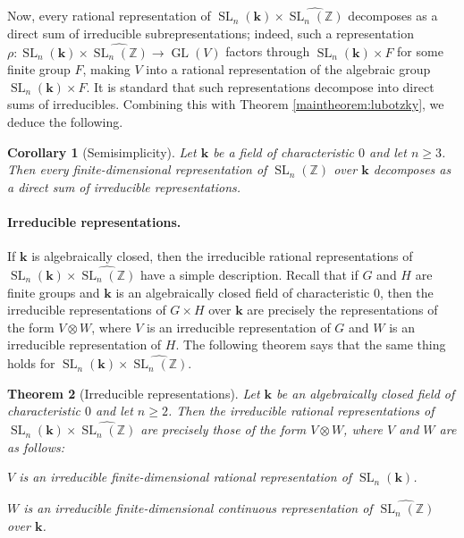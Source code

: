 \documentclass[11pt]{article}
\numberwithin{equation}{section}
\theoremstyle{plain}
\newtheorem{maintheorem}{Theorem}
\newtheorem{maincorollary}[maintheorem]{Corollary}
\theoremstyle{definition}
\theoremstyle{remark}
\DeclareMathOperator{\GL}{GL}
\DeclareMathOperator{\SL}{SL}
\newcommand\Z{\ensuremath{\mathbb{Z}}}
\newcommand\bk{\ensuremath{\mathbf{k}}}
\newcommand\tSLn{\ensuremath{\widehat{\SL_n(\Z)}}}
\begin{document}
Now, every rational representation of $\SL_n(\bk) \times \tSLn$ decomposes as a direct sum of irreducible
subrepresentations; indeed, such a representation $\rho\colon \SL_n(\bk) \times \tSLn \rightarrow \GL(V)$
factors through $\SL_n(\bk) \times F$ for some finite group $F$, making $V$ into a rational
representation of the algebraic group $\SL_n(\bk) \times F$.  It is standard that such representations
decompose into direct sums of irreducibles.  Combining this with Theorem \ref{maintheorem:lubotzky}, we deduce
the following.

\begin{maincorollary}[Semisimplicity]
\label{maincorollary:semisimple}
Let $\bk$ be a field of characteristic $0$ and let $n \geq 3$.  Then every finite-dimensional representation
of $\SL_n(\Z)$ over $\bk$ decomposes as a direct sum of irreducible representations.
\end{maincorollary}

\paragraph{Irreducible representations.}
If $\bk$ is algebraically closed, then the irreducible rational representations of $\SL_n(\bk) \times \tSLn$
have a simple description.  Recall that if $G$ and $H$ are finite groups and $\bk$ is an algebraically
closed field of characteristic $0$, then the irreducible representations of $G \times H$ over $\bk$ are precisely
the representations of the form $V \otimes W$, where $V$ is an irreducible representation of $G$ and
$W$ is an irreducible representation of $H$.  The following theorem says that the same thing holds
for $\SL_n(\bk) \times \tSLn$.

\begin{maintheorem}[Irreducible representations]
\label{maintheorem:irreducible}
Let $\bk$ be an algebraically closed field of characteristic $0$ and let $n \geq 2$.  Then the
irreducible rational representations of $\SL_n(\bk) \times \tSLn$ are precisely those of the
form $V \otimes W$, where $V$ and $W$ are as follows:
\begin{compactitem}
\item $V$ is an irreducible finite-dimensional rational representation of $\SL_n(\bk)$.
\item $W$ is an irreducible finite-dimensional continuous representation of $\tSLn$ over $\bk$.
\end{compactitem}
\end{maintheorem}
\end{document}
